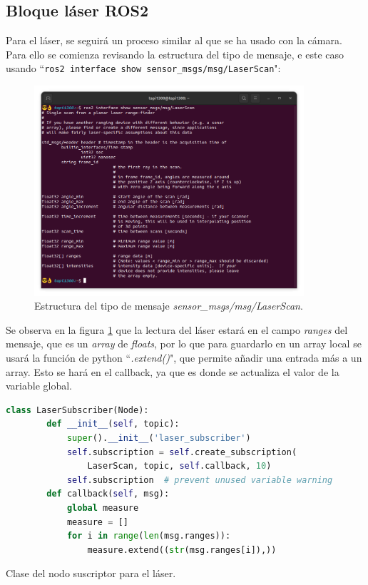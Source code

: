 \subsection{Bloque láser ROS2}
\label{subsec:laserROS2}
Para el láser, se seguirá un proceso similar al que se ha usado con la cámara. Para ello se comienza revisando la estructura del tipo de mensaje, e
 este caso usando ``\lstinline|ros2 interface show sensor_msgs/msg/LaserScan|":
\begin{figure} [H]
  \begin{center}
      \includegraphics[width=10cm]{figs/c4/laserscan_struct.png}
  \end{center}
  \caption[Estructura mensaje LaserScan]{Estructura del tipo de mensaje \textit{sensor\_msgs/msg/LaserScan}.}
  \label{fig:laserscanstruct}
\end{figure}
Se observa en la figura \ref{fig:laserscanstruct} que la lectura del láser estará en el campo \textit{ranges} del mensaje, que es un \textit{array}
de \textit{floats}, por lo que para guardarlo en un array local se usará la función de python ``\textit{.extend()}", que permite añadir una entrada
más a un array. Esto se hará en el callback, ya que es donde se actualiza el valor de la variable global.
\begin{code}[H]
  \begin{lstlisting}[language=python]
    class LaserSubscriber(Node):
        def __init__(self, topic):
            super().__init__('laser_subscriber')
            self.subscription = self.create_subscription(
                LaserScan, topic, self.callback, 10)
            self.subscription  # prevent unused variable warning
        def callback(self, msg):
            global measure
            measure = []
            for i in range(len(msg.ranges)):
                measure.extend((str(msg.ranges[i]),))
  \end{lstlisting}
  \caption[Clase del nodo suscriptor para láser]{Clase del nodo suscriptor para el láser.}
  \label{cod:laser_node_class}
\end{code}

